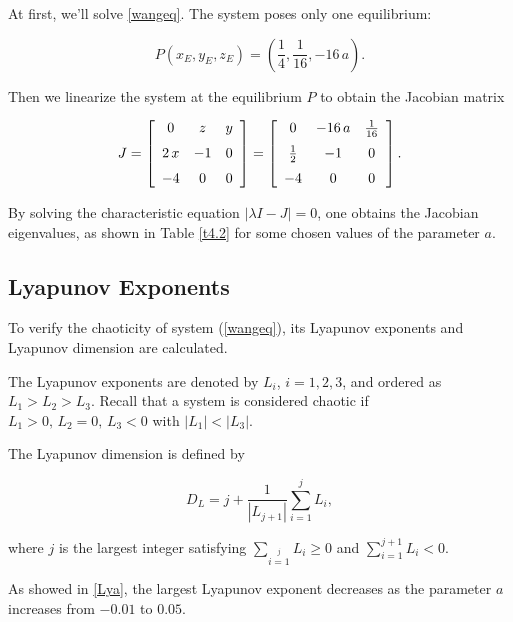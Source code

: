 At first, we'll solve \ref{wangeq}. The system poses only one equilibrium:

\begin{equation}
  P \left( x_{E},y_{E},z_{E} \right) =\left(\frac{1}{4},\frac{1}{16},-16\,a\right).
\end{equation}

Then we linearize the system at the equilibrium $P$ to obtain the Jacobian matrix 

\begin{equation}
  J=\left[
    \begin {array}{ccc} 0&z&y\\ \noalign{\medskip}2\,x&-1&0
      \\ \noalign{\medskip}-4&0&0\end {array} \right] = \left[
    \begin {array}{ccc} 0&-16\,a&\frac{1}{16}\\
      \noalign{\medskip}\frac{1}{2}&-1&0
      \\ \noalign{\medskip}-4&0&0\end {array}
      \right].
\end{equation}

By solving the characteristic equation $|\lambda I - J|=0$, one
obtains the Jacobian eigenvalues, as shown in Table \ref{t4.2} for some
chosen values of the parameter $a$.

\subsection{Lyapunov Exponents}

To verify the chaoticity of system (\ref{wangeq}), its Lyapunov
exponents and Lyapunov dimension are calculated.

The Lyapunov exponents are denoted by $L_i$, $i=1,2,3$, and
ordered as $L_1>L_2>L_3$. Recall that a system is considered chaotic if
$L_1>0,\,L_2=0,\,L_3<0$ with $|L_1|<|L_3|$.

The Lyapunov dimension is defined by

\begin{equation}
  D_L=j+\frac{1}{|L_{j+1}|}\sum_{i=1}^j{L_i},
\end{equation}

where $j$ is the largest integer satisfying
$\sum_{i=1}\limits^j{L_i}\ge0$ and $\sum_{i=1}^{j+1}{L_i}<0$.

As showed in \ref{Lya}, the largest Lyapunov exponent decreases
as the parameter $a$ increases from $-0.01$ to $0.05$.

